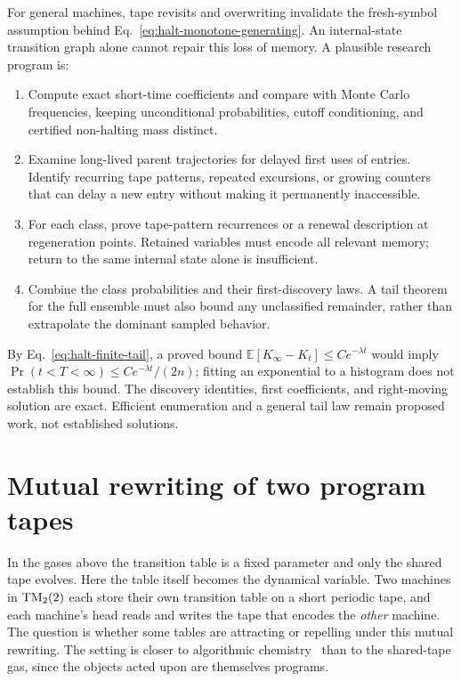 \documentclass{article}
\begin{document}
For general machines, tape revisits and overwriting invalidate the
fresh-symbol assumption behind Eq.~\eqref{eq:halt-monotone-generating}.
An internal-state transition graph alone cannot repair this loss of
memory.  A plausible research program is:
\begin{enumerate}
\setlength{\itemsep}{0pt}
\item Compute exact short-time coefficients and compare with Monte Carlo
frequencies, keeping unconditional probabilities, cutoff conditioning,
and certified non-halting mass distinct.
\item Examine long-lived parent trajectories for delayed first uses of
entries.  Identify recurring tape patterns, repeated excursions, or
growing counters that can delay a new entry without making it permanently
inaccessible.
\item For each class, prove tape-pattern recurrences or a renewal
description at regeneration points.  Retained variables must encode all
relevant memory; return to the same internal state alone is insufficient.
\item Combine the class probabilities and their first-discovery laws.
A tail theorem for the full ensemble must also bound any unclassified
remainder, rather than extrapolate the dominant sampled behavior.
\end{enumerate}
By Eq.~\eqref{eq:halt-finite-tail}, a proved bound
$\mathbb E[K_\infty-K_t]\leq C e^{-\lambda t}$ would imply
$\Pr(t<T<\infty)\leq C e^{-\lambda t}/(2n)$; fitting an exponential to a
histogram does not establish this bound.  The discovery identities, first
coefficients, and right-moving solution are exact.  Efficient enumeration
and a general tail law remain proposed work, not established solutions.

\clearpage
\section{Mutual rewriting of two program tapes}
\label{sec:mutual-rewriting}

In the gases above the transition table is a fixed parameter and only the
shared tape evolves.  Here the table itself becomes the dynamical variable.
Two machines in ${\rm TM}_2(2)$ each store their own transition table on a
short periodic tape, and each machine's head reads and writes the tape that
encodes the \emph{other} machine.  The question is whether some tables are
attracting or repelling under this mutual rewriting.  The setting is closer
to algorithmic chemistry~\citep{fontana1991chemistry} than to the
shared-tape gas, since the objects acted upon are themselves programs.
\end{document}
